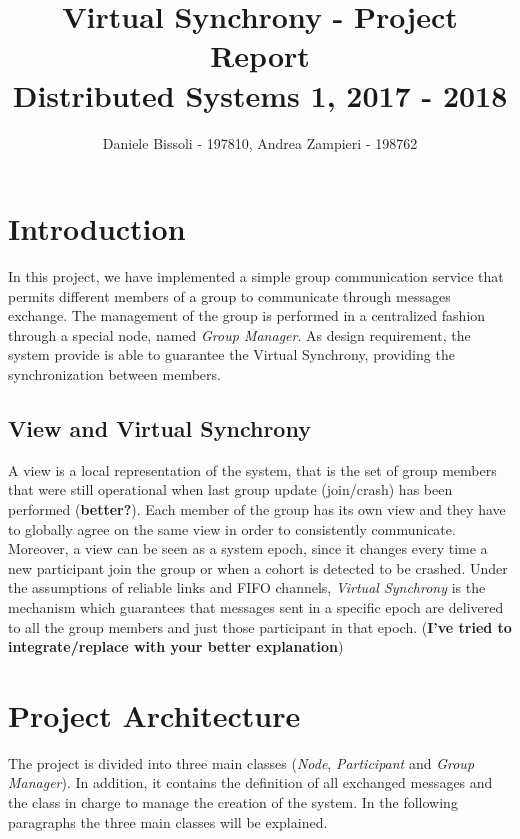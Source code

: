 \documentclass[11pt]{article}
\title{\LARGE{\textbf{Virtual Synchrony - Project Report}\\[0mm]\large{Distributed Systems 1, 2017 - 2018}}}
\author{Daniele Bissoli - 197810, Andrea Zampieri - 198762}
\date{}
\begin{document}
	\maketitle
	
	\section{Introduction}
	In this project, we have implemented a simple group communication service that permits different members of a group to communicate through messages exchange. The management of the group is performed in a centralized fashion through a special node, named \textit{Group Manager}. As design requirement, the system provide is able to guarantee the Virtual Synchrony, providing the synchronization between members.
	
	\subsection{View and Virtual Synchrony}
	A view is a local representation of the system, that is the set of group members that were still operational when last group update (join/crash) has been performed (\textbf{better?}). Each member of the group has its own view and they have to globally agree on the same view in order to consistently communicate. Moreover, a view can be seen as a system epoch, since it changes every time a new participant join the group or when a cohort is detected to be crashed.
	Under the assumptions of reliable links and FIFO channels, \textit{Virtual Synchrony} is the mechanism which guarantees that messages sent in a specific epoch are delivered to all the group members and just those participant in that epoch.
	(\textbf{I've tried to integrate/replace with your better explanation})
	
	\section{Project Architecture}
	The project is divided into three main classes (\textit{Node}, \textit{Participant} and \textit{Group Manager}). In addition, it contains the definition of all exchanged messages and the class in charge to manage the creation of the system. In the following paragraphs the three main classes will be explained.
	
\end{document}
